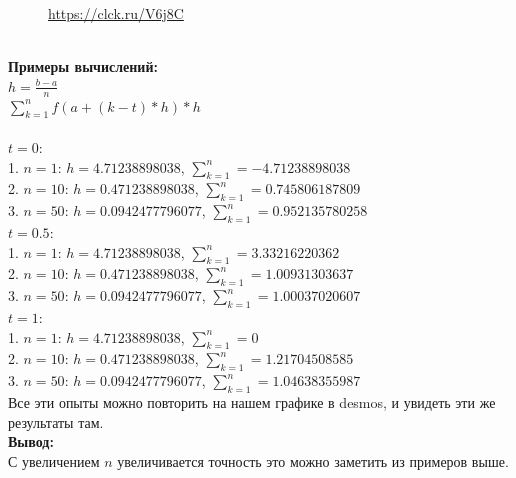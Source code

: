 \documentclass{article}
\begin{document}
\begin{figure}[h!]
\caption*{\url{https://clck.ru/V6j8C}}
\end{figure}
\newpage
\\
\textbf{Примеры вычислений:}\\
$ h = \frac{b-a}{n} $\\
$ \sum\limits^{n}_{k = 1} f(a+(k-t)*h)*h $\\\\
$ t = 0 $:\\
1. $ n = 1 $: $ h = 4.71238898038 $, $ \sum\limits^{n}_{k = 1} = −4.71238898038 $\\
2. $ n = 10 $: $ h = 0.471238898038 $, $ \sum\limits^{n}_{k = 1} = 0.745806187809 $\\
3. $ n = 50 $: $ h = 0.0942477796077 $, $ \sum\limits^{n}_{k = 1} = 0.952135780258 $\\
$ t = 0.5 $:\\
1. $ n = 1 $: $ h = 4.71238898038 $, $ \sum\limits^{n}_{k = 1} = 3.33216220362 $\\
2. $ n = 10 $: $ h = 0.471238898038 $, $ \sum\limits^{n}_{k = 1} = 1.00931303637 $\\
3. $ n = 50 $: $ h = 0.0942477796077 $, $ \sum\limits^{n}_{k = 1} = 1.00037020607 $\\
$ t = 1 $:\\
1. $ n = 1 $: $ h = 4.71238898038 $, $ \sum\limits^{n}_{k = 1} = 0 $\\
2. $ n = 10 $: $ h = 0.471238898038 $, $ \sum\limits^{n}_{k = 1} = 1.21704508585 $\\
3. $ n = 50 $: $ h = 0.0942477796077 $, $ \sum\limits^{n}_{k = 1} = 1.04638355987 $\\
Все эти опыты можно повторить на нашем графике в desmos, и увидеть эти же результаты там.\\
\textbf{Вывод:}\\
С увеличением $ n $ увеличивается точность это можно заметить из примеров выше.
\newpage
\Large
\end{document}
